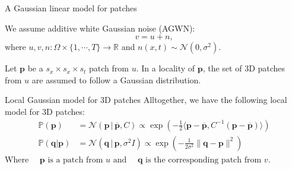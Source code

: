 \documentclass[mathserif, 8pt]{beamer}
\newcommand{\ma}[1]{\boldsymbol{#1}}
\begin{document}
\begin{frame}{A Gaussian linear model for patches}

	 We assume additive white Gaussian noise (AGWN):
	\[v = u + n,\]
	where $u,v,n:\Omega\times \{1,\cdots,T\}\rightarrow\mathds R$ and $n(x,t)\sim \mathcal N(0,\sigma^2)$.

	\bigskip                        

	\pause

	 Let $\ma p$ be a
	$s_x\times s_x\times s_t$ patch from $u$. In a locality of $\ma p$, 
	the set of 3D patches from $u$ are assumed to follow a Gaussian distribution. 



	\bigskip

	\pause

	\begin{block}{Local Gaussian model for 3D patches}
	Alltogether, we have the following local model for 3D patches:
	\begin{align*}
		\mathds{P}(\ma p) &= \mathcal N(\ma p\,|\,\overline {\ma p}, C) 
		                   \propto \exp\left(-\frac12\langle \ma p - \overline{\ma p}, 
		                                C^{-1}(\ma p - \overline{\ma p})\rangle\right)\\
		\mathds{P}(\ma q|\ma p) &= \mathcal N(\ma q\,|\,\ma p, \sigma^2 I) 
		             \propto \exp\left(-\frac1{2\sigma^2}\|\ma q - \ma p\|^2\right)
	\end{align*}
	Where 
	$
		\quad \ma p  \,\, \text{is a patch from } u \text{ and }
		\quad \ma q  \,\, \text{is the corresponding patch from } v.
	$
	\end{block}

\end{frame}
\end{document}
